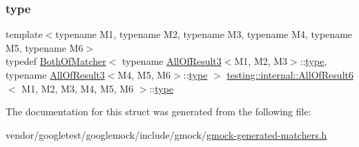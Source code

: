 \subsubsection{\texorpdfstring{type}{type}}
{\footnotesize\ttfamily template$<$typename M1, typename M2, typename M3, typename M4, typename M5, typename M6$>$ \\
typedef \hyperlink{classtesting_1_1internal_1_1_both_of_matcher}{Both\+Of\+Matcher}$<$ typename \hyperlink{structtesting_1_1internal_1_1_all_of_result3}{All\+Of\+Result3}$<$M1, M2, M3$>$\+::\hyperlink{structtesting_1_1internal_1_1_all_of_result6_a5385655911ce2c1d3fccd802c1754139}{type}, typename \hyperlink{structtesting_1_1internal_1_1_all_of_result3}{All\+Of\+Result3}$<$M4, M5, M6$>$\+::\hyperlink{structtesting_1_1internal_1_1_all_of_result6_a5385655911ce2c1d3fccd802c1754139}{type} $>$ \hyperlink{structtesting_1_1internal_1_1_all_of_result6}{testing\+::internal\+::\+All\+Of\+Result6}$<$ M1, M2, M3, M4, M5, M6 $>$\+::\hyperlink{structtesting_1_1internal_1_1_all_of_result6_a5385655911ce2c1d3fccd802c1754139}{type}}



The documentation for this struct was generated from the following file\+:\begin{DoxyCompactItemize}
\item 
vendor/googletest/googlemock/include/gmock/\hyperlink{gmock-generated-matchers_8h}{gmock-\/generated-\/matchers.\+h}\end{DoxyCompactItemize}
